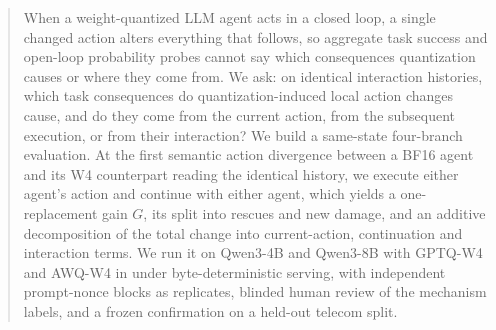 \begin{abstract}
When a weight-quantized LLM agent acts in a closed loop, a single changed action alters everything that follows, so aggregate task success and open-loop probability probes cannot say which consequences quantization causes or where they come from. We ask: on identical interaction histories, which task consequences do quantization-induced local action changes cause, and do they come from the current action, from the subsequent execution, or from their interaction? We build a same-state four-branch evaluation. At the first semantic action divergence between a BF16 agent and its W4 counterpart reading the identical history, we execute either agent's action and continue with either agent, which yields a one-replacement gain $G$, its split into rescues and new damage, and an additive decomposition of the total change into current-action, continuation and interaction terms. We run it on Qwen3-4B and Qwen3-8B with GPTQ-W4 and AWQ-W4 in \tautwo{} under byte-deterministic serving, with independent prompt-nonce blocks as replicates, blinded human review of the mechanism labels, and a frozen confirmation on a held-out telecom split. 
\end{abstract}
